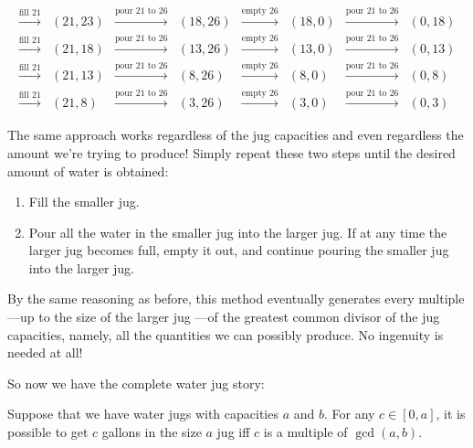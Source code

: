 \[\begin{array}{cccccccc}
\xrightarrow{\text{fill 21}} & (21,23)&
\xrightarrow{\text{pour 21 to 26}} & (18,26)& \xrightarrow{\text{empty
    26}} & (18,0)& \xrightarrow{\text{pour 21 to 26}} &
(0,18)\\
\xrightarrow{\text{fill 21}} & (21,18)&
\xrightarrow{\text{pour 21 to 26}} & (13,26)& \xrightarrow{\text{empty
    26}} & (13,0)& \xrightarrow{\text{pour 21 to 26}} &
(0,13)\\
\xrightarrow{\text{fill 21}} & (21,13)&
\xrightarrow{\text{pour 21 to 26}} & (8,26)& \xrightarrow{\text{empty
    26}} & (8,0)& \xrightarrow{\text{pour 21 to 26}} &
(0,8)\\
\xrightarrow{\text{fill 21}} & (21,8)& \xrightarrow{\text{pour
    21 to 26}} & (3,26)& \xrightarrow{\text{empty 26}} & (3,0)&
\xrightarrow{\text{pour 21 to 26}} & (0,3)
\end{array}
\]

The same approach works regardless of the jug capacities and even
regardless the amount we're trying to produce!  Simply repeat these
two steps until the desired amount of water is obtained:
\begin{enumerate}
\item Fill the smaller jug.

\item Pour all the water in the smaller jug into the larger jug.  If
  at any time the larger jug becomes full, empty it out, and continue
  pouring the smaller jug into the larger jug.
\end{enumerate}
By the same reasoning as before, this method eventually generates
every multiple ---up to the size of the larger jug ---of the greatest
common divisor of the jug capacities, namely, all the quantities we
can possibly produce.  No ingenuity is needed at all!

So now we have the complete water jug story:
\begin{theorem}\label{th:waterjugs}
Suppose that we have water jugs with capacities $a$ and $b$.  For any
$c \in [0,a]$, it is possible to get $c$ gallons in the size $a$ jug
iff $c$ is a multiple of $\gcd(a, b)$.
\end{theorem}

